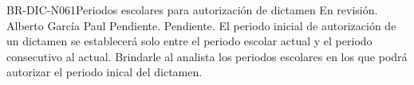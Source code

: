 \begin{BusinessRule}{BR-DIC-N061}{Periodos escolares para autorización de dictamen}
	{\bcCondition} %
	{\btEnabler}     %
	{\blControlling}     %
	\BRItem[Estado] En revisión.
	 Alberto García Paul 
	 Pendiente.
	 Pendiente. 
	\BRItem[Descripción] El periodo inicial de autorización de un dictamen se establecerá solo entre el periodo escolar actual y el periodo consecutivo al actual. 
	\BRItem[Motivación] Brindarle al analista los periodos escolares en los que podrá autorizar el periodo inical del dictamen.
\end{BusinessRule}

